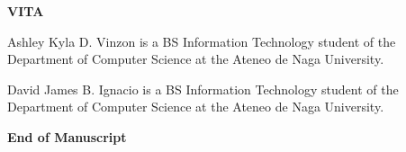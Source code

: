 
\thispagestyle{empty}          %
\vspace*{\fill}                %

\begin{center}
{\large\bfseries VITA}
\end{center}

\vspace{1.5em}

\hspace*{\parindent}Ashley Kyla D. Vinzon is a BS Information Technology student of the Department of Computer Science at the Ateneo de Naga University.

\vspace{1.5em}

\hspace*{\parindent}David James B. Ignacio is a BS Information Technology student of the Department of Computer Science at the Ateneo de Naga University.

\vspace{2em}

\begin{center}
{\large\bfseries End of Manuscript}
\end{center}

\vspace*{\fill}
\newpage